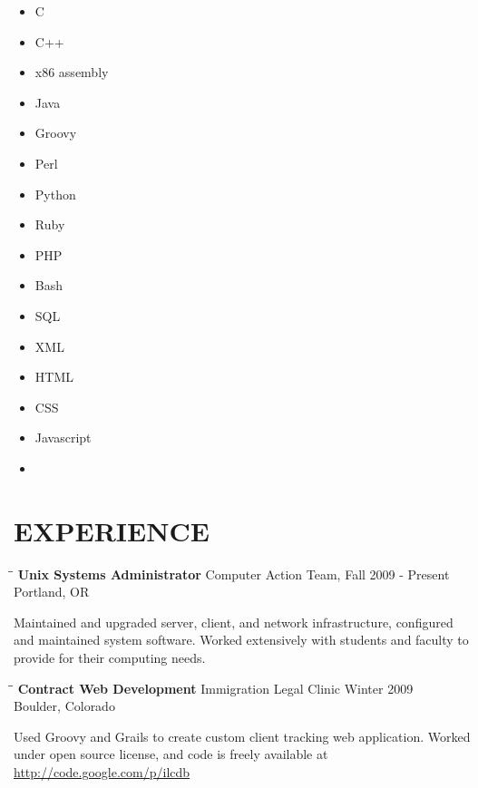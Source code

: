 \documentclass{res}
\begin{document}
\begin{resume}
\begin{multicols}{4}
  \begin{itemize}
    \item C
    \item C++
    \item x86 assembly
    \item Java
    \item Groovy
    \item Perl
    \item Python
    \item Ruby
    \item PHP
    \item Bash
    \item SQL
    \item XML
    \item HTML
    \item CSS
    \item Javascript
    \item \LaTeXe
  \end{itemize}
\end{multicols}

\vspace{-0.25in}

\section{EXPERIENCE}
  \vspace{-0.1in}
  \begin{tabbing}
  \hspace{2.3in}\= \hspace{2.6in}\= \kill %
  {\bf Unix Systems Administrator} \>Computer Action Team, \>Fall 2009 - Present\\
			   \>Portland, OR
  \end{tabbing}\vspace{-20pt}      %
  Maintained and upgraded server, client, and network infrastructure, configured
  and maintained system software. Worked extensively with students and faculty to
  provide for their computing needs.

  \vspace{-0.21in}

  \begin{tabbing}
  \hspace{2.3in}\= \hspace{2.6in}\= \kill %
  {\bf Contract Web Development} \>Immigration Legal Clinic\> Winter 2009\\
			\>Boulder, Colorado
  \end{tabbing}\vspace{-20pt}
  Used Groovy and Grails to create custom client tracking web application.
  Worked under open source license, and code is freely available at
  \url{http://code.google.com/p/ilcdb}


\end{resume}
\end{document}

